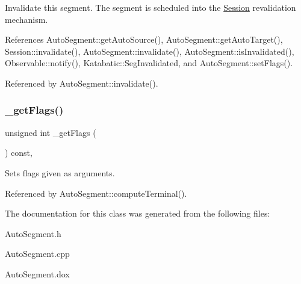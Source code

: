 Invalidate this segment. The segment is scheduled into the \hyperlink{classKatabatic_1_1Session}{Session} revalidation mechanism. 

References Auto\+Segment\+::get\+Auto\+Source(), Auto\+Segment\+::get\+Auto\+Target(), Session\+::invalidate(), Auto\+Segment\+::invalidate(), Auto\+Segment\+::is\+Invalidated(), Observable\+::notify(), Katabatic\+::\+Seg\+Invalidated, and Auto\+Segment\+::set\+Flags().



Referenced by Auto\+Segment\+::invalidate().

\mbox{\label{classKatabatic_1_1AutoSegment_ae5b4a4f67d480cd5c9ce104e73e73da9}} 
\subsubsection{\texorpdfstring{\+\_\+get\+Flags()}{\_getFlags()}}
{\footnotesize\ttfamily unsigned int \+\_\+get\+Flags (\begin{DoxyParamCaption}{ }\end{DoxyParamCaption}) const\hspace{0.3cm}{\ttfamily [inline]}, {\ttfamily [protected]}}

Sets {\ttfamily flags} given as arguments. 

Referenced by Auto\+Segment\+::compute\+Terminal().



The documentation for this class was generated from the following files\+:\begin{DoxyCompactItemize}
\item 
Auto\+Segment.\+h\item 
Auto\+Segment.\+cpp\item 
Auto\+Segment.\+dox\end{DoxyCompactItemize}
